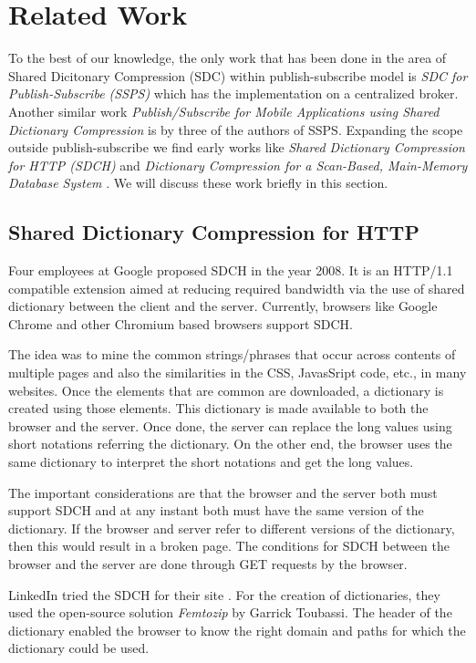 \section{Related Work}

To the best of our knowledge, the only work that has been done in the area of Shared Dicitonary Compression (SDC) within publish-subscribe model is \textit {SDC for Publish-Subscribe (SSPS)} \parencite{Doblander:2016:SDC} which has the implementation on a centralized broker. Another similar work \textit {Publish/Subscribe for Mobile Applications using Shared Dictionary Compression} \parencite{sdcdemo} is by three of the authors of SSPS. Expanding the scope outside publish-subscribe we find early works like \textit{Shared Dictionary Compression for HTTP (SDCH)} \parencite{sdch} and \textit{Dictionary Compression for a Scan-Based, Main-Memory Database System} \parencite{sdc_db}. We will discuss these work briefly in this section. 

\subsection{Shared Dictionary Compression for HTTP}

Four employees at Google proposed SDCH in the year 2008. It is an HTTP/1.1 compatible extension aimed at reducing required bandwidth via the use of shared dictionary between the client and the server.
Currently, browsers like Google Chrome and other Chromium based browsers support SDCH.

The idea was to mine the common strings/phrases that occur across contents of multiple pages and also the similarities in the CSS, JavasSript code, etc., in many websites.  Once the elements that are common are downloaded, a dictionary is created using those elements. This dictionary is made available to both the browser and the server. Once done, the server can replace the long values using short notations referring the dictionary. On the other end, the browser uses the same dictionary to interpret the short notations and get the long values. 

The important considerations are that the browser and the server both must support SDCH and at any instant both must have the same version of the dictionary. If the browser and server refer to different versions of the dictionary, then this would result in a broken page. The conditions for SDCH between the browser and the server are done through GET requests by the browser.

LinkedIn tried the SDCH for their site \parencite{sdc_linkedin}. For the creation of dictionaries, they used the open-source solution \textit{Femtozip} by Garrick Toubassi. The header of the dictionary enabled the browser to know the right domain and paths for which the dictionary could be used. 

